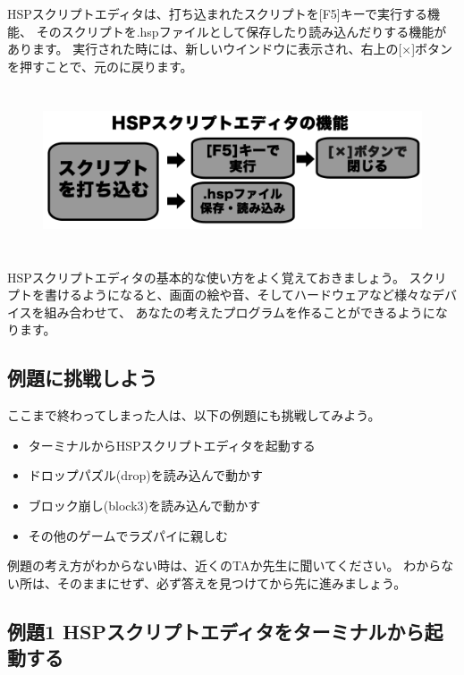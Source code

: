 HSPスクリプトエディタは、打ち込まれたスクリプトを[F5]キーで実行する機能、
そのスクリプトを.hspファイルとして保存したり読み込んだりする機能があります。
実行された時には、新しいウインドウに表示され、右上の[×]ボタンを押すことで、元のに戻ります。

\begin{figure}[H]
  \begin{center}
    \includegraphics[width=15.533cm,height=4.86cm]{images/chap02/text02-img013.png}
  \end{center}
  \label{fig:hsp_shoot3}
\end{figure}

HSPスクリプトエディタの基本的な使い方をよく覚えておきましょう。
スクリプトを書けるようになると、画面の絵や音、そしてハードウェアなど様々なデバイスを組み合わせて、
あなたの考えたプログラムを作ることができるようになります。
\clearpage

% 
% 
% 
\subsection{例題に挑戦しよう}

ここまで終わってしまった人は、以下の例題にも挑戦してみよう。

\begin{itemize}
  \item ターミナルからHSPスクリプトエディタを起動する
  \item ドロップパズル(drop)を読み込んで動かす
  \item ブロック崩し(block3)を読み込んで動かす
  \item その他のゲームでラズパイに親しむ
\end{itemize}

\noindent
例題の考え方がわからない時は、近くのTAか先生に聞いてください。
わからない所は、そのままにせず、必ず答えを見つけてから先に進みましょう。
\clearpage

% 
% 
% 
\subsection{例題1 HSPスクリプトエディタをターミナルから起動する}

